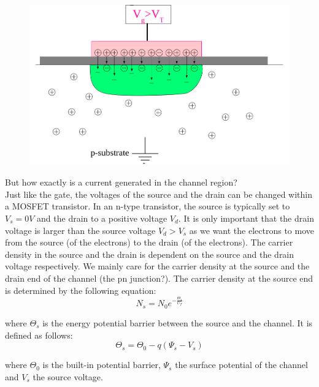\begin{figure}
    \centering
    \includegraphics[width=.8\linewidth]{Figures/mosfet_inversion.png}
    \caption{}
    \label{fig:mosfet_inversion}
\end{figure}

But how exactly is a current generated in the channel region?\\

Just like the gate, the voltages of the source and the drain can be changed within a MOSFET transistor. In an n-type transistor, the source is typically set to $V_s = 0V$ and the drain to a positive voltage $V_d$. It is only important that the drain voltage is larger than the source voltage $V_d > V_s$ as we want the electrons to move from the source (of the electrons) to the drain (of the electrons). The carrier density in the source and the drain is dependent on the source and the drain voltage respectively. We mainly care for the carrier density at the source and the drain end of the channel (the pn junction?). The carrier density at the source end is determined by the following equation:\\

\begin{equation}
    N_s = N_0 e^{-\frac{\Theta_s}{U_T}}
\end{equation}

where $\Theta_s$ is the energy potential barrier between the source and the channel. It is defined as follows:\\

\begin{equation}
    \Theta_s = \Theta_0 - q(\Psi_s-V_s)
\end{equation}

where $\Theta_0$ is the built-in potential barrier, $\Psi_s$ the surface potential of the channel and $V_s$ the source voltage.\\

